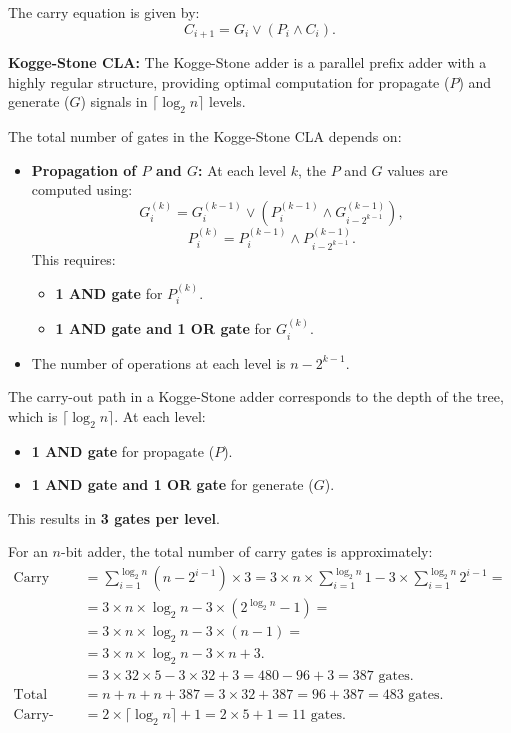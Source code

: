 The carry equation is given by:
\[
C_{i+1} = G_i \lor (P_i \land C_i).
\]


\textbf{Kogge-Stone CLA:}
The Kogge-Stone adder is a parallel prefix adder with a highly regular structure, providing optimal computation for propagate ($P$) and generate ($G$) signals in $\lceil \log_2 n \rceil$ levels.

The total number of gates in the Kogge-Stone CLA depends on:
\begin{itemize}
    \item \textbf{Propagation of $P$ and $G$:} 
    At each level $k$, the $P$ and $G$ values are computed using:
    \[
    G_i^{(k)} = G_i^{(k-1)} \lor \left(P_i^{(k-1)} \land G_{i-2^{k-1}}^{(k-1)}\right),
    \]
    \[
    P_i^{(k)} = P_i^{(k-1)} \land P_{i-2^{k-1}}^{(k-1)}.
    \]
    This requires:
    \begin{itemize}
        \item \textbf{1 AND gate} for $P_i^{(k)}$.
        \item \textbf{1 AND gate and 1 OR gate} for $G_i^{(k)}$.
    \end{itemize}
    \item The number of operations at each level is $n - 2^{k-1}$.
\end{itemize}

The carry-out path in a Kogge-Stone adder corresponds to the depth of the tree, which is $\lceil \log_2 n \rceil$. At each level:
\begin{itemize}
    \item \textbf{1 AND gate} for propagate ($P$).
    \item \textbf{1 AND gate and 1 OR gate} for generate ($G$).
\end{itemize}
This results in \textbf{3 gates per level}.

For an \( n \)-bit adder, the total number of carry gates is approximately:
\begin{equation*}
    \begin{split}
\text{Carry Gates} & = \sum_{i=1}^{\log_2 n} \left( n - 2^{i-1} \right) \times 3 = 3 \times n \times \sum_{i=1}^{\log_2 n} 1 - 3 \times \sum_{i=1}^{\log_2 n} 2^{i-1} = \\
                  & = 3 \times n \times \log_2 n - 3 \times \left( 2^{\log_2 n} - 1 \right) = \\
                  & = 3 \times n \times \log_2 n - 3 \times (n - 1) = \\
                  & = 3 \times n \times \log_2 n - 3 \times n + 3. \\
                  & = 3 \times 32 \times 5 - 3 \times 32 + 3 = 480 - 96 + 3 = 387 \text{ gates}. \\
\text{Total gates} & = n + n + n + 387 =  3 \times 32 + 387 = 96 + 387 = 483 \text{ gates}. \\
\text{Carry-out path} & = 2 \times \lceil \log_2 n \rceil + 1 = 2 \times 5 + 1 = 11 \text{ gates}.
    \end{split}
\end{equation*}

